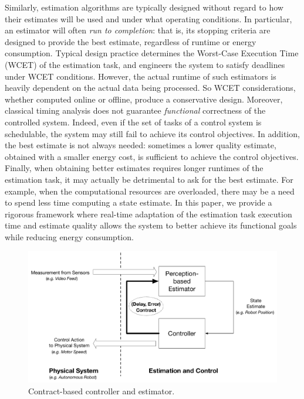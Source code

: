 Similarly, estimation algorithms are typically designed without regard to how their estimates will be used and under what operating conditions.
In particular, an estimator will often \emph{run to completion}: that is, its stopping criteria are designed to provide the best estimate, regardless of runtime or energy consumption.
Typical design practice determines the Worst-Case Execution Time (WCET) of the estimation task, and engineers the system to satisfy deadlines under WCET conditions.
However, the actual runtime of such estimators is heavily dependent on the actual data being processed. 
So WCET considerations, whether computed online or offline, produce a conservative design.
Moreover, classical timing analysis does not guarantee \emph{functional} correctness of the controlled system.
Indeed, even if the set of tasks of a control system is schedulable, the system may still fail to achieve its control objectives.
In addition, the best estimate is not always needed:
sometimes a lower quality estimate, obtained with a smaller energy cost, is sufficient to achieve the control objectives.
Finally, when obtaining better estimates requires longer runtimes of the estimation task, it may actually be detrimental to ask for the best estimate.
For example, when the computational resources are overloaded, there may be a need to spend less time computing a state estimate. 
In this paper, we provide a rigorous framework where real-time adaptation of the estimation task execution time and estimate quality allows the system to better achieve its functional goals while reducing energy consumption.
\begin{figure}[t]
	\centering
	\includegraphics[scale=0.3]{figures/omnigraffle_figures/high_level_figure.pdf}
	\caption{Contract-based controller and estimator.}
	\label{fig:codesignedCE}
\end{figure}

